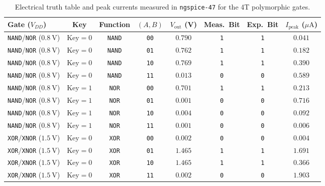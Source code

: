 \begin{table}[htbp]
\centering
\caption{Electrical truth table and peak currents measured in \texttt{ngspice-47} for the 4T polymorphic gates.}
\label{tab:polymorphic_gates}
\footnotesize
\begin{tabular}{l c c c c c c c}
\toprule
\textbf{Gate ($V_{DD}$)} & \textbf{Key} & \textbf{Function} & $(A,B)$ & $V_{\mathrm{out}}$ (V) & \textbf{Meas.\ Bit} & \textbf{Exp.\ Bit} & $I_{\mathrm{peak}}$ ($\mu\text{A}$) \\
\midrule
\texttt{NAND}/\texttt{NOR} ($0.8\ \text{V}$) & $\text{Key}=0$ & \texttt{NAND} & \texttt{00} & $0.790$ & \texttt{1} & \texttt{1} & $0.041$ \\
\texttt{NAND}/\texttt{NOR} ($0.8\ \text{V}$) & $\text{Key}=0$ & \texttt{NAND} & \texttt{01} & $0.762$ & \texttt{1} & \texttt{1} & $0.182$ \\
\texttt{NAND}/\texttt{NOR} ($0.8\ \text{V}$) & $\text{Key}=0$ & \texttt{NAND} & \texttt{10} & $0.769$ & \texttt{1} & \texttt{1} & $0.390$ \\
\texttt{NAND}/\texttt{NOR} ($0.8\ \text{V}$) & $\text{Key}=0$ & \texttt{NAND} & \texttt{11} & $0.013$ & \texttt{0} & \texttt{0} & $0.589$ \\
\texttt{NAND}/\texttt{NOR} ($0.8\ \text{V}$) & $\text{Key}=1$ & \texttt{NOR}  & \texttt{00} & $0.701$ & \texttt{1} & \texttt{1} & $0.213$ \\
\texttt{NAND}/\texttt{NOR} ($0.8\ \text{V}$) & $\text{Key}=1$ & \texttt{NOR}  & \texttt{01} & $0.001$ & \texttt{0} & \texttt{0} & $0.716$ \\
\texttt{NAND}/\texttt{NOR} ($0.8\ \text{V}$) & $\text{Key}=1$ & \texttt{NOR}  & \texttt{10} & $0.004$ & \texttt{0} & \texttt{0} & $0.092$ \\
\texttt{NAND}/\texttt{NOR} ($0.8\ \text{V}$) & $\text{Key}=1$ & \texttt{NOR}  & \texttt{11} & $0.001$ & \texttt{0} & \texttt{0} & $0.006$ \\
\midrule
\texttt{XOR}/\texttt{XNOR} ($1.5\ \text{V}$) & $\text{Key}=0$ & \texttt{XOR}  & \texttt{00} & $0.002$ & \texttt{0} & \texttt{0} & $0.004$ \\
\texttt{XOR}/\texttt{XNOR} ($1.5\ \text{V}$) & $\text{Key}=0$ & \texttt{XOR}  & \texttt{01} & $1.465$ & \texttt{1} & \texttt{1} & $1.691$ \\
\texttt{XOR}/\texttt{XNOR} ($1.5\ \text{V}$) & $\text{Key}=0$ & \texttt{XOR}  & \texttt{10} & $1.465$ & \texttt{1} & \texttt{1} & $0.366$ \\
\texttt{XOR}/\texttt{XNOR} ($1.5\ \text{V}$) & $\text{Key}=0$ & \texttt{XOR}  & \texttt{11} & $0.002$ & \texttt{0} & \texttt{0} & $1.903$ \\

\end{tabular}
\end{table}
